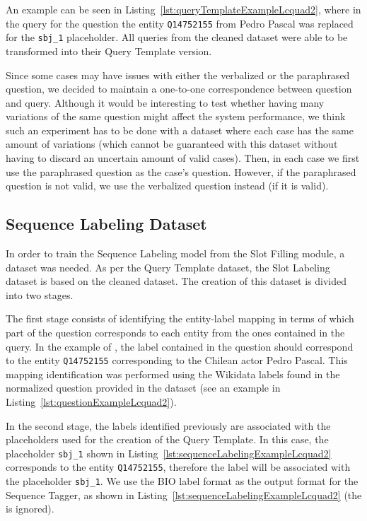 An example can be seen in Listing~\ref{lst:queryTemplateExampleLcquad2}, where in the \SPARQL{} 
query for the question  the entity \texttt{Q14752155} 
from Pedro Pascal was replaced for the \texttt{sbj\_1} placeholder. All queries from the cleaned dataset 
were able to be transformed into their Query Template version.

Since some cases may have issues with either the verbalized or the paraphrased question, we 
decided to maintain a one-to-one correspondence between question and query. Although it would 
be interesting to test whether having many variations of the same question might affect the 
system performance, we think such an experiment has to be done with a dataset where each case has 
the same amount of variations (which cannot be guaranteed with this dataset without having to 
discard an uncertain amount of valid cases). Then, in each case we first use the paraphrased 
question as the case’s question. However, if the paraphrased question is not valid, we use the 
verbalized question instead (if it is valid).

\subsection{Sequence Labeling Dataset}
\label{cap4:experimentalDesign/QaDataset/seqLabeling}
In order to train the Sequence Labeling model from the Slot Filling module, a dataset was 
needed. As per the Query Template dataset, the Slot Labeling dataset is based on the cleaned 
\LCQuADtwo{} dataset. The creation of this dataset is divided into two stages. 

The first stage consists of identifying the entity-label mapping in terms of which part of the 
question corresponds to each entity from the ones contained in the \SPARQL{} query. In the example 
of , the label  contained in the 
question should correspond to the entity \texttt{Q14752155} corresponding to the Chilean actor Pedro 
Pascal. This mapping identification was performed using the Wikidata labels found in the normalized 
question provided in the \LCQuADtwo{} dataset (see an example in Listing~\ref{lst:questionExampleLcquad2}).

In the second stage, the labels identified previously are associated with the placeholders used 
for the creation of the Query Template. In this case, the placeholder \texttt{sbj\_1} shown in 
Listing~\ref{lst:sequenceLabelingExampleLcquad2} corresponds to the entity \texttt{Q14752155}, 
therefore the label  will be associated with the placeholder \texttt{sbj\_1}. 
We use the BIO label format as the output format for the Sequence Tagger, as shown in 
Listing~\ref{lst:sequenceLabelingExampleLcquad2} (the  is ignored).

